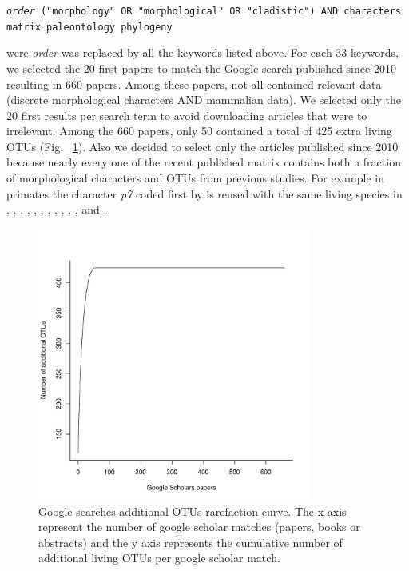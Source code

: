 \texttt{\textit{order} ("morphology" OR "morphological" OR "cladistic") AND characters matrix paleontology phylogeny}

were \textit{order} was replaced by all the keywords listed above. For each 33 keywords, we selected the 20 first papers to match the Google search published since 2010 resulting in 660 papers.
Among these papers, not all contained relevant data (discrete morphological characters AND mammalian data).
We selected only the 20 first results per search term to avoid downloading articles that were to irrelevant. Among the 660 papers, only 50 contained a total of 425 extra living OTUs (Fig. ~\ref{Supp_figure_google_searches}).
Also we decided to select only the articles published since 2010 because nearly every one of the recent published matrix contains both a fraction of morphological characters and OTUs from previous studies.
For example in primates the character \textit{p7} coded first by \cite{ross1998phylogenetic} is reused with the same living species in \cite{seiffert2003fossil}, \cite{marivaux2005anthropoid}, \cite{seiffert2005basal}, \cite{bloch2007new}, \cite{bloch2007new}, \cite{kay2008anatomy}, \cite{silcox2008biogeographic}, \cite{seiffert2009convergent}, \cite{tabuce2009anthropoid}, \cite{boyer2010astragalar}, \cite{seiffert2010fossil}, \cite{marivaux2013djebelemur} and \cite{ni2013oldest}.

\begin{figure}[!h]
\centering
    \includegraphics[width=0.8\textwidth]{Missing_mammals/Figures/Supp_figure_google_searches.pdf}
\caption[Google searches additional OTUs rarefaction curve]{Google searches additional OTUs rarefaction curve. The x axis represent the number of google scholar matches (papers, books or abstracts) and the y axis represents the cumulative number of additional living OTUs per google scholar match.}
\label{Supp_figure_google_searches}
\end{figure}

